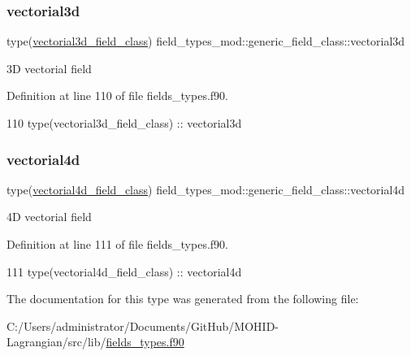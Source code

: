 \subsubsection{\texorpdfstring{vectorial3d}{vectorial3d}}
{\footnotesize\ttfamily type(\mbox{\hyperlink{structfield__types__mod_1_1vectorial3d__field__class}{vectorial3d\+\_\+field\+\_\+class}}) field\+\_\+types\+\_\+mod\+::generic\+\_\+field\+\_\+class\+::vectorial3d\hspace{0.3cm}{\ttfamily [private]}}



3D vectorial field 



Definition at line 110 of file fields\+\_\+types.\+f90.


\begin{DoxyCode}
110         \textcolor{keywordtype}{type}(vectorial3d\_field\_class) :: vectorial3d
\end{DoxyCode}
\mbox{\label{structfield__types__mod_1_1generic__field__class_aacaaa8b6fccdfca7ac5c88104e6dab57}} 
\subsubsection{\texorpdfstring{vectorial4d}{vectorial4d}}
{\footnotesize\ttfamily type(\mbox{\hyperlink{structfield__types__mod_1_1vectorial4d__field__class}{vectorial4d\+\_\+field\+\_\+class}}) field\+\_\+types\+\_\+mod\+::generic\+\_\+field\+\_\+class\+::vectorial4d\hspace{0.3cm}{\ttfamily [private]}}



4D vectorial field 



Definition at line 111 of file fields\+\_\+types.\+f90.


\begin{DoxyCode}
111         \textcolor{keywordtype}{type}(vectorial4d\_field\_class) :: vectorial4d
\end{DoxyCode}


The documentation for this type was generated from the following file\+:\begin{DoxyCompactItemize}
\item 
C\+:/\+Users/administrator/\+Documents/\+Git\+Hub/\+M\+O\+H\+I\+D-\/\+Lagrangian/src/lib/\mbox{\hyperlink{fields__types_8f90}{fields\+\_\+types.\+f90}}\end{DoxyCompactItemize}
